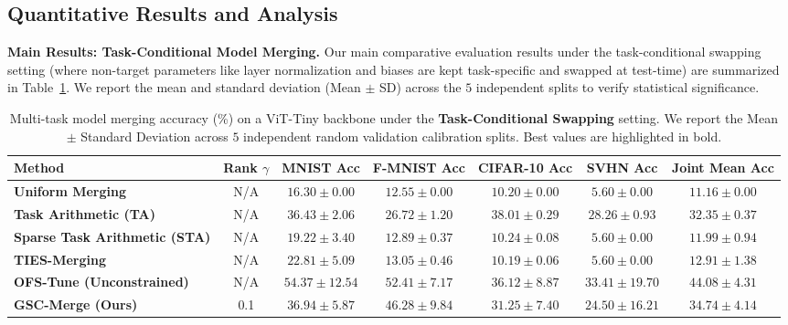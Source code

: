 \subsection{Quantitative Results and Analysis}
\label{subsec:results_analysis}

\textbf{Main Results: Task-Conditional Model Merging.}
Our main comparative evaluation results under the task-conditional swapping setting (where non-target parameters like layer normalization and biases are kept task-specific and swapped at test-time) are summarized in Table~\ref{tab:results_tc}. We report the mean and standard deviation (Mean $\pm$ SD) across the $5$ independent splits to verify statistical significance.

\begin{table}[t]
\caption{Multi-task model merging accuracy (\%) on a ViT-Tiny backbone under the \textbf{Task-Conditional Swapping} setting. We report the Mean $\pm$ Standard Deviation across $5$ independent random validation calibration splits. Best values are highlighted in bold.}
\label{tab:results_tc}
\vskip 0.15in
\begin{center}
\begin{small}
\begin{sc}
\setlength{\tabcolsep}{2.5pt}
\begin{tabular}{lcccccc}
\toprule
Method & Rank $\gamma$ & MNIST Acc & F-MNIST Acc & CIFAR-10 Acc & SVHN Acc & Joint Mean Acc \\
\midrule
\textbf{Uniform Merging} & N/A & $16.30 \pm 0.00$ & $12.55 \pm 0.00$ & $10.20 \pm 0.00$ & $5.60 \pm 0.00$ & $11.16 \pm 0.00$ \\
\textbf{Task Arithmetic (TA)} & N/A & $36.43 \pm 2.06$ & $26.72 \pm 1.20$ & $\mathbf{38.01 \pm 0.29}$ & $28.26 \pm 0.93$ & $32.35 \pm 0.37$ \\
\textbf{Sparse Task Arithmetic (STA)} & N/A & $19.22 \pm 3.40$ & $12.89 \pm 0.37$ & $10.24 \pm 0.08$ & $5.60 \pm 0.00$ & $11.99 \pm 0.94$ \\
\textbf{TIES-Merging} & N/A & $22.81 \pm 5.09$ & $13.05 \pm 0.46$ & $10.19 \pm 0.06$ & $5.60 \pm 0.00$ & $12.91 \pm 1.38$ \\
\textbf{OFS-Tune (Unconstrained)} & N/A & $\mathbf{54.37 \pm 12.54}$ & $52.41 \pm 7.17$ & $36.12 \pm 8.87$ & $\mathbf{33.41 \pm 19.70}$ & $\mathbf{44.08 \pm 4.31}$ \\
\midrule
\textbf{GSC-Merge (Ours)} & 0.1 & $36.94 \pm 5.87$ & $46.28 \pm 9.84$ & $31.25 \pm 7.40$ & $24.50 \pm 16.21$ & $34.74 \pm 4.14$ \\

\end{tabular}
\end{sc}
\end{small}
\end{center}
\end{table}
